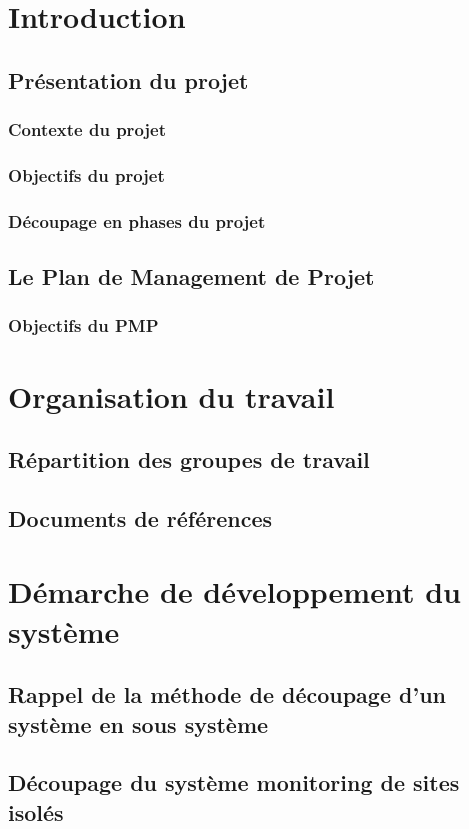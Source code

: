 \section{Introduction}
\subsection{Présentation du projet}
\subsubsection{Contexte du projet}
\subsubsection{Objectifs du projet}
\subsubsection{Découpage en phases du projet}
\subsection{Le Plan de Management de Projet}
\subsubsection{Objectifs du PMP}

\section{Organisation du travail}
\subsection{Répartition des groupes de travail}
\subsection{Documents de références}
\section{Démarche de développement du système}

\subsection{Rappel de la méthode de découpage d'un système en sous système}

\subsection{Découpage du système monitoring de sites isolés}
